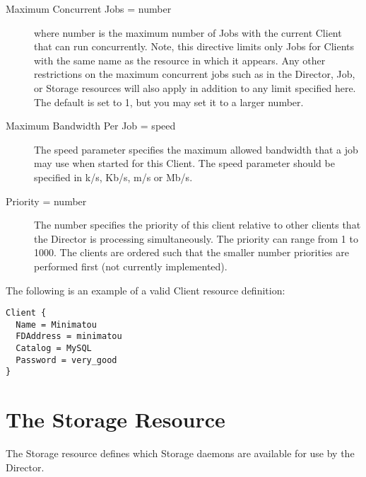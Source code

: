 \begin{description}
\item [Maximum Concurrent Jobs = \lt{}number\gt{}]
   where \lt{}number\gt{}  is the maximum number of Jobs with the current Client
   that  can run concurrently. Note, this directive limits only Jobs  for Clients
   with the same name as the resource in which it appears. Any  other
   restrictions on the maximum concurrent jobs such as in  the Director, Job, or
   Storage resources will also apply in addition to  any limit specified here.
   The  default is set to 1, but you may set it to a larger number.

\item [Maximum Bandwidth Per Job = \lt{}speed\gt{}]

The speed parameter specifies the maximum allowed bandwidth that a job may use
when started for this Client. The speed parameter should be specified in
k/s, Kb/s, m/s or Mb/s.

\item [Priority = \lt{}number\gt{}]
   The number specifies the  priority of this client relative to other clients
   that the  Director is processing simultaneously. The priority can range  from
   1 to 1000. The clients are ordered such that the smaller  number priorities
   are performed first (not currently  implemented). 
\end{description}

   The following is an example of a valid Client resource definition: 

\footnotesize
\begin{verbatim}
Client {
  Name = Minimatou
  FDAddress = minimatou
  Catalog = MySQL
  Password = very_good
}
\end{verbatim}
\normalsize

\section{The Storage Resource}
\label{StorageResource2}

The Storage resource defines which Storage daemons are available for use by
the Director. 

